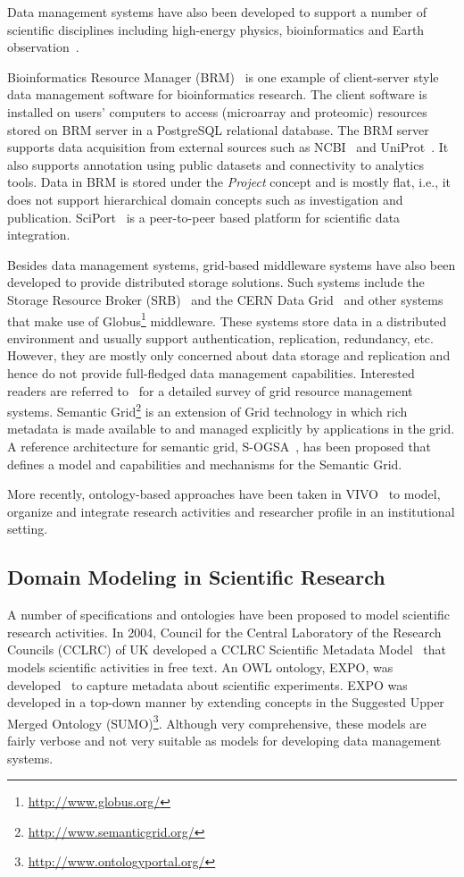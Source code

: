 \documentclass[conference,10pt]{IEEEtran}
\begin{document}
Data management systems have also been developed to support a number of scientific disciplines including high-energy physics, bioinformatics and Earth observation~\cite{652836}.

Bioinformatics Resource Manager (BRM)~\cite{brm2007} is one example of client-server style data management software for bioinformatics research. The client software is installed on users' computers to access (microarray and proteomic) resources stored on BRM server in a PostgreSQL relational database. The BRM server supports data acquisition from external sources such as NCBI~\cite{ncbi} and UniProt~\cite{citeulike:503151}. It also supports annotation using public datasets and connectivity to analytics tools. Data in BRM is stored under the \emph{Project} concept and is mostly flat, i.e., it does not support hierarchical domain concepts such as investigation and publication. SciPort~\cite{1326001} is a peer-to-peer based platform for scientific data integration.

Besides data management systems, grid-based middleware systems have also been developed to provide distributed storage solutions. Such systems include the Storage Resource Broker (SRB)~\cite{783165} and the CERN Data Grid~\cite{652836} and other systems that make use of Globus\footnote{\url{http://www.globus.org/}} middleware. These systems store data in a distributed environment and usually support authentication, replication, redundancy, etc. However, they are mostly only concerned about data storage and replication and hence do not provide full-fledged data management capabilities. Interested readers are referred to~\cite{565296} for a detailed survey of grid resource management systems. Semantic Grid\footnote{\url{http://www.semanticgrid.org/}} is an extension of Grid technology in which rich metadata is made available to and managed explicitly by applications in the grid. A reference architecture for semantic grid, S-OGSA~\cite{citeulike:1021910}, has been proposed that defines a model and capabilities and mechanisms for the Semantic Grid.

More recently, ontology-based approaches have been taken in VIVO~\cite{vivo10} to model, organize and integrate research activities and researcher profile in an institutional setting.

\subsection{Domain Modeling in Scientific Research}
A number of specifications and ontologies have been proposed to model scientific research activities. In 2004, Council for the Central Laboratory of the Research Councils (CCLRC) of UK developed a CCLRC Scientific Metadata Model~\cite{Spallation_metadatamodel} that models scientific activities in free text. An OWL ontology, EXPO, was developed~\cite{citeulike:3735746} to capture metadata about scientific experiments. EXPO was developed in a top-down manner by extending concepts in the Suggested Upper Merged Ontology (SUMO)\footnote{\url{http://www.ontologyportal.org/}}. Although very comprehensive, these models are fairly verbose and not very suitable as models for developing data management systems.
\end{document}
